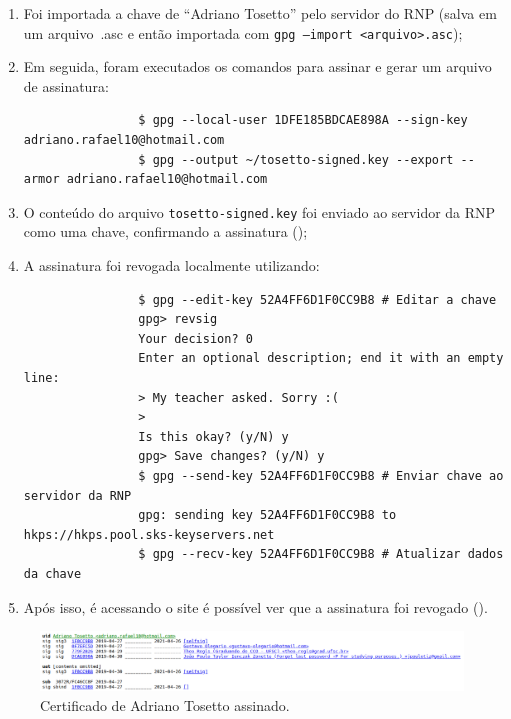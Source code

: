 \documentclass{article}
\begin{document}
    \begin{enumerate}
        \item Foi importada a chave de ``Adriano Tosetto'' pelo servidor do RNP
            (salva em um arquivo~.asc e então importada com \texttt{gpg
            --import <arquivo>.asc});
        \item Em seguida, foram executados os comandos para assinar e gerar um
            arquivo de assinatura:

            \begin{verbatim}
                $ gpg --local-user 1DFE185BDCAE898A --sign-key adriano.rafael10@hotmail.com
                $ gpg --output ~/tosetto-signed.key --export --armor adriano.rafael10@hotmail.com
            \end{verbatim}

        \item O conteúdo do arquivo \texttt{tosetto-signed.key} foi enviado ao
            servidor da RNP como uma chave, confirmando a assinatura
            ();
        \item A assinatura foi revogada localmente utilizando:

            \begin{verbatim}
                $ gpg --edit-key 52A4FF6D1F0CC9B8 # Editar a chave
                gpg> revsig
                Your decision? 0
                Enter an optional description; end it with an empty line:
                > My teacher asked. Sorry :(
                >
                Is this okay? (y/N) y
                gpg> Save changes? (y/N) y
                $ gpg --send-key 52A4FF6D1F0CC9B8 # Enviar chave ao servidor da RNP
                gpg: sending key 52A4FF6D1F0CC9B8 to hkps://hkps.pool.sks-keyservers.net
                $ gpg --recv-key 52A4FF6D1F0CC9B8 # Atualizar dados da chave
            \end{verbatim}
        \item Após isso, é acessando o site é possível ver que a assinatura foi
            revogado ().
    \end{enumerate}

    \begin{figure}[h]
        \centering
        \includegraphics[keepaspectratio,width=1\textwidth]{tosetto-signed}
        \caption{%
            Certificado de Adriano Tosetto assinado.\label{fig:revokee-sign}
        }
    \end{figure}
\end{document}
